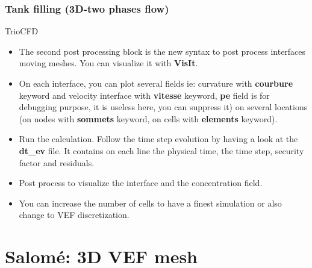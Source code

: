 \documentclass[10pt, hyperref={unicode=true,pdfusetitle, bookmarks=true,bookmarksnumbered=false,bookmarksopen=false, breaklinks=false,pdfborder={0 0 1},backref=true,colorlinks=true,linkcolor=darkblue,pageanchor}]{beamer}
\begin{document}
\begin{frame}
\frametitle{Tank filling (3D-two phases flow)}
\begin{block}{TrioCFD}

\begin{itemize}
\item The second post processing block is the new syntax to post process interfaces moving meshes. You can visualize it with \textbf{VisIt}. 

\item On each interface, you can plot several fields ie: curvature with \textbf{courbure} keyword and velocity interface with \textbf{vitesse} keyword, \textbf{pe} field is for debugging purpose, it is useless here, you can suppress it) on several locations (on nodes with \textbf{sommets} keyword, on cells with \textbf{elements} keyword).

\item Run the calculation. Follow the time step evolution by having a look at the \textbf{dt\_ev} file. It contains on each line the physical time, the time step, security factor and residuals.

\item Post process to visualize the interface and the concentration field.

\item You can increase the number of cells to have a finest simulation or also change to VEF discretization.

\end{itemize}

\end{block}
\end{frame}



\section{{\bf{Salom\'e: 3D VEF mesh}}} \label{salome}
\end{document}
